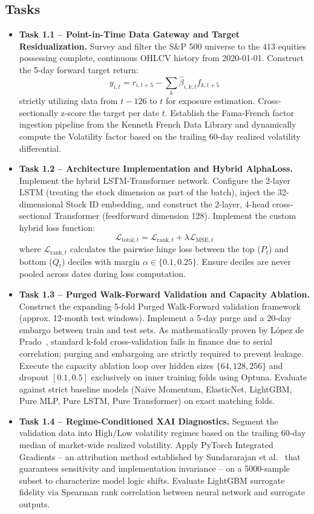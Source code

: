 \subsection*{Tasks}
\begin{itemize}
    \item \textbf{Task 1.1 -- Point-in-Time Data Gateway and Target Residualization.} Survey and filter the S\&P 500 universe to the 413 equities possessing complete, continuous \acs{OHLCV} history from 2020-01-01. Construct the 5-day forward target return:
          \[
              y_{i,t} = r_{i,t+5} - \sum_{k}\hat{\beta}_{i,k,t}f_{k,t+5}
          \]
          strictly utilizing data from $t-126$ to $t$ for exposure estimation. Cross-sectionally z-score the target per date $t$. Establish the Fama-French factor ingestion pipeline from the Kenneth French Data Library and dynamically compute the Volatility factor based on the trailing 60-day realized volatility differential.

    \item \textbf{Task 1.2 -- Architecture Implementation and Hybrid AlphaLoss.} Implement the hybrid LSTM-Transformer network. Configure the 2-layer LSTM (treating the stock dimension as part of the batch), inject the 32-dimensional Stock ID embedding, and construct the 2-layer, 4-head cross-sectional Transformer (feedforward dimension 128). Implement the custom hybrid loss function:
          \[
              \mathcal{L}_{\text{total},t} = \mathcal{L}_{\text{rank},t} + \lambda \mathcal{L}_{\text{MSE},t}
          \]
          where $\mathcal{L}_{\text{rank},t}$ calculates the pairwise hinge loss between the top ($P_t$) and bottom ($Q_t$) deciles with margin $\alpha \in \{0.1, 0.25\}$. Ensure deciles are never pooled across dates during loss computation.

    \item \textbf{Task 1.3 -- Purged Walk-Forward Validation and Capacity Ablation.} Construct the expanding 5-fold Purged Walk-Forward validation framework (approx. 12-month test windows). Implement a 5-day purge and a 20-day embargo between train and test sets. As mathematically proven by López de Prado~\cite{LopezdePrado2018}, standard k-fold cross-validation fails in finance due to serial correlation; purging and embargoing are strictly required to prevent leakage. Execute the capacity ablation loop over hidden sizes $\{64, 128, 256\}$ and dropout $[0.1, 0.5]$ exclusively on inner training folds using Optuna. Evaluate against strict baseline models (Naive Momentum, ElasticNet, LightGBM, Pure MLP, Pure LSTM, Pure Transformer) on exact matching folds.

    \item \textbf{Task 1.4 -- Regime-Conditioned \acs{XAI} Diagnostics.} Segment the validation data into High/Low volatility regimes based on the trailing 60-day median of market-wide realized volatility. Apply PyTorch Integrated Gradients -- an attribution method established by Sundararajan et al.~\cite{Sundararajan2017} that guarantees sensitivity and implementation invariance -- on a 5000-sample subset to characterize model logic shifts. Evaluate LightGBM surrogate fidelity via Spearman rank correlation between neural network and surrogate outputs.
\end{itemize}


